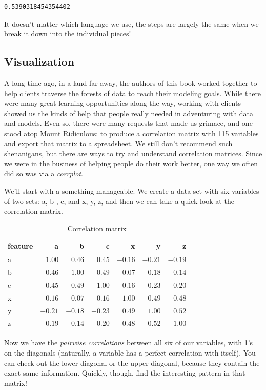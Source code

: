\documentclass[
  letterpaper,
]{krantz}
\begin{document}
\begin{verbatim}
0.5390318454354402
\end{verbatim}

It doesn't matter which language we use, the steps are largely the same
when we break it down into the individual pieces!

\subsection{Visualization}\label{visualization}

A long time ago, in a land far away, the authors of this book worked
together to help clients traverse the forests of data to reach their
modeling goals. While there were many great learning opportunities along
the way, working with clients showed us the kinds of help that people
really needed in adventuring with data and models. Even so, there were
many requests that made us grimace, and one stood atop Mount Ridiculous:
to produce a correlation matrix with 115 variables and export that
matrix to a spreadsheet. We still don't recommend such shenanigans, but
there are ways to try and understand correlation matrices. Since we were
in the business of helping people do their work better, one way we often
did so was via a \emph{corrplot}.

We'll start with a something manageable. We create a data set with six
variables of two sets: a, b , c, and x, y, z, and then we can take a
quick look at the correlation matrix.

\begin{longtable}{lrrrrrr}
\caption{Correlation matrix}\tabularnewline

\toprule
feature & a & b & c & x & y & z \\ 
\midrule\addlinespace[2.5pt]
a & $1.00$ & $0.46$ & $0.45$ & $-0.16$ & $-0.21$ & $-0.19$ \\ 
b & $0.46$ & $1.00$ & $0.49$ & $-0.07$ & $-0.18$ & $-0.14$ \\ 
c & $0.45$ & $0.49$ & $1.00$ & $-0.16$ & $-0.23$ & $-0.20$ \\ 
x & $-0.16$ & $-0.07$ & $-0.16$ & $1.00$ & $0.49$ & $0.48$ \\ 
y & $-0.21$ & $-0.18$ & $-0.23$ & $0.49$ & $1.00$ & $0.52$ \\ 
z & $-0.19$ & $-0.14$ & $-0.20$ & $0.48$ & $0.52$ & $1.00$ \\ 
\bottomrule
\end{longtable}

Now we have the \emph{pairwise correlations} between all six of our
variables, with 1's on the diagonals (naturally, a variable has a
perfect correlation with itself). You can check out the lower diagonal
or the upper diagonal, because they contain the exact same information.
Quickly, though, find the interesting pattern in that matrix!
\end{document}
